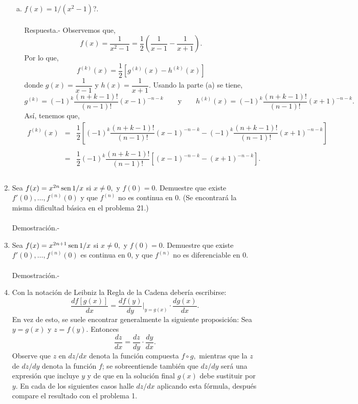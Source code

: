 \begin{enumerate}[\bfseries 1.]
\begin{enumerate}[(a)]
	    \item $f(x)=1/(x^2-1)$?.\\\\
		Respuesta.-\; Observemos que,
		$$f(x)=\dfrac{1}{x^2-1}=\dfrac{1}{2}\left(\dfrac{1}{x-1}-\dfrac{1}{x+1}\right).$$
		Por lo que,
		$$f^{(k)}(x)=\dfrac{1}{2}\left[g^{(k)}(x)-h^{(k)}(x)\right]$$
		donde $g(x)=\dfrac{1}{x-1}$ y $h(x)=\dfrac{1}{x+1}$. Usando la parte (a) se tiene,
		$$g^{(k)}=(-1)^k \dfrac{(n+k-1)!}{(n-1)!}(x-1)^{-n-k} \qquad \mbox{y}\qquad h^{(k)}(x)=(-1)^k \dfrac{(n+k-1)!}{(n-1)!}(x+1)^{-n-k}.$$
		Así, tenemos que,
		$$\begin{array}{rcl}
		    f^{(k)}(x)&=&\dfrac{1}{2}\left[(-1)^k \dfrac{(n+k-1)!}{(n-1)!}(x-1)^{-n-k}-(-1)^k \dfrac{(n+k-1)!}{(n-1)!}(x+1)^{-n-k}\right]\\\\
			      &=&\dfrac{1}{2}(-1)^k \dfrac{(n+k-1)!}{(n-1)!}\left[(x-1)^{-n-k}-(x+1)^{-n-k}\right].\\\\
		\end{array}$$
		\vspace{.5cm}

	 \end{enumerate}

     \item Sea $f(x)=x^{2n}\mathop{\mbox{\normalfont sen}}\nolimits 1/x$ si $x\neq 0,$ y $f(0)=0$. Demuestre que existe $f'(0),\ldots , f^{(n)}(0)$ y que $f^{(n)}$ no es continua en $0$. (Se encontrará la misma dificultad básica en el problema 21.)\\\\
	 Demostración.-\; 

     \item Sea $f(x)=x^{2n+1}\mathop{\mbox{\normalfont sen}}\nolimits 1/x$ si $x\neq 0,$ y $f(0)=0$. Demuestre que existe $f'(0),\ldots , f^{(n)}(0)$ es continua en $0$, y que $f^{(n)}$ no es diferenciable en $0$.\\\\
	 Demostración.-\; 

     \item Con la notación de Leibniz la Regla de la Cadena debería escribirse:
	 $$\dfrac{df\left[g(x)\right]}{dx}=\dfrac{df(y)}{dy}\bigg|_{y=g(x)}\cdot \dfrac{dg(x)}{dx}.$$
	 En vez de esto, se suele encontrar generalmente la siguiente proposición: Sea $y=g(x)$ y $z=f(y)$. Entonces
	 $$\dfrac{dz}{dx}=\dfrac{dz}{dy}\cdot \dfrac{dy}{dx}.$$
	 Observe que $z$ en $dz/dx$ denota la función compuesta $f\circ g,$ mientras que la $z$ de $dz/dy$ denota la función $f$; se sobreentiende también que $dz/dy$ será una expresión que incluye $y$ y de que en la solución final $g(x)$ debe sustituir por $y$. En cada de los siguientes casos halle $dz/dx$ aplicando esta fórmula, después compare el resultado con el problema 1.


\end{enumerate}
